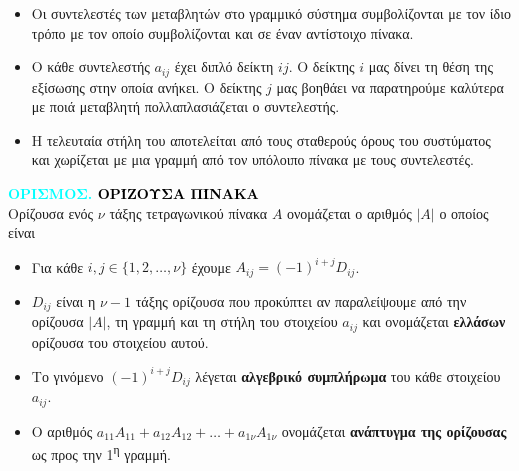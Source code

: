 \documentclass[twoside,10pt]{book}
\newcounter{orismos}[chapter]
\renewcommand{\theorismos}{\thechapter.\arabic{orismos}}
\newcommand{\Orismos}[1]{\refstepcounter{orismos}\textcolor{cyan}{\textbf{ΟΡΙΣΜΟΣ\hspace{2mm}\theorismos\hspace{1mm} \textcolor{black}{\MakeUppercase{#1}}}}\\}{}
\begin{document}
\begin{itemize}
\item Οι συντελεστές των μεταβλητών στο γραμμικό σύστημα συμβολίζονται με τον ίδιο τρόπο με τον οποίο συμβολίζονται και σε έναν αντίστοιχο πίνακα.
\item Ο κάθε συντελεστής $ a_{ij} $ έχει διπλό δείκτη $ ij $. Ο δείκτης $ i $ μας δίνει τη θέση της εξίσωσης στην οποία ανήκει. Ο δείκτης $ j $ μας βοηθάει να παρατηρούμε καλύτερα με ποιά μεταβλητή πολλαπλασιάζεται ο συντελεστής.
\item Η τελευταία στήλη του αποτελείται από τους σταθερούς όρους του συστύματος και χωρίζεται με μια γραμμή από τον υπόλοιπο πίνακα με τους συντελεστές.
\end{itemize} 
\Orismos{Ορίζουσα πίνακα}
Ορίζουσα ενός $ \nu $ τάξης τετραγωνικού πίνακα $ A $ ονομάζεται ο αριθμός $ |A| $ ο οποίος είναι
\begin{center}
\end{center} 
\begin{itemize}[itemsep=0mm]
\item Για κάθε $ i,j\in\{1,2,\ldots,\nu\} $ έχουμε $ A_{ij}=(-1)^{i+j}D_{ij} $.
\item $ D_{ij} $ είναι η $ \nu-1 $ τάξης ορίζουσα που προκύπτει αν παραλείψουμε από την ορίζουσα $ |A| $, τη γραμμή και τη στήλη του στοιχείου $ a_{ij} $ και ονομάζεται \textbf{ελλάσων} ορίζουσα του στοιχείου αυτού.
\item Το γινόμενο $ (-1)^{i+j}D_{ij} $ λέγεται \textbf{αλγεβρικό συμπλήρωμα} του κάθε στοιχείου $ a_{ij} $.
\item Ο αριθμός $ a_{11}A_{11}+a_{12}A_{12}+\ldots+a_{1\nu}A_{1\nu} $ ονομάζεται \textbf{ανάπτυγμα της ορίζουσας} ως προς την 1\textsuperscript{η} γραμμή.
\end{itemize}
\end{document}
